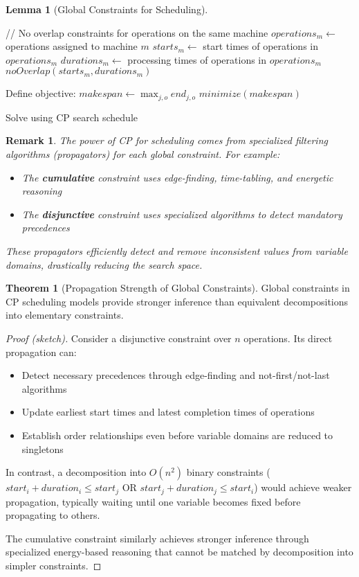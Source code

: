 \documentclass{article}
\newtheorem{remark}{Remark}
\theoremstyle{definition}
\newtheorem{theorem}{Theorem}
\newtheorem{lemma}{Lemma}
\begin{document}
\begin{lemma}[Global Constraints for Scheduling]
\begin{algorithm}
\begin{algorithmic}[1]
    \State \quad // No overlap constraints for operations on the same machine
        \State $operations_m \gets$ operations assigned to machine $m$
        \State $starts_m \gets$ start times of operations in $operations_m$
        \State $durations_m \gets$ processing times of operations in $operations_m$
        \State $noOverlap(starts_m, durations_m)$
    \EndFor
    
    \State Define objective:
    \State \quad $makespan \gets \max_{j,o} end_{j,o}$
    \State \quad $minimize(makespan)$
    
    \State Solve using CP search
    \State \Return schedule
\EndProcedure
\end{algorithmic}
\end{algorithm}

\begin{remark}
The power of CP for scheduling comes from specialized filtering algorithms (propagators) for each global constraint. For example:
\begin{itemize}
    \item The \textbf{cumulative} constraint uses edge-finding, time-tabling, and energetic reasoning
    \item The \textbf{disjunctive} constraint uses specialized algorithms to detect mandatory precedences
\end{itemize}
These propagators efficiently detect and remove inconsistent values from variable domains, drastically reducing the search space.
\end{remark}
\end{lemma}

\begin{theorem}[Propagation Strength of Global Constraints]
Global constraints in CP scheduling models provide stronger inference than equivalent decompositions into elementary constraints.

\begin{proof}[Proof (sketch)]
Consider a disjunctive constraint over $n$ operations. Its direct propagation can:
\begin{itemize}
    \item Detect necessary precedences through edge-finding and not-first/not-last algorithms
    \item Update earliest start times and latest completion times of operations
    \item Establish order relationships even before variable domains are reduced to singletons
\end{itemize}

In contrast, a decomposition into $O(n^2)$ binary constraints ($start_i + duration_i \leq start_j$ OR $start_j + duration_j \leq start_i$) would achieve weaker propagation, typically waiting until one variable becomes fixed before propagating to others.

The cumulative constraint similarly achieves stronger inference through specialized energy-based reasoning that cannot be matched by decomposition into simpler constraints.
\end{proof}
\end{theorem}
\end{document}
